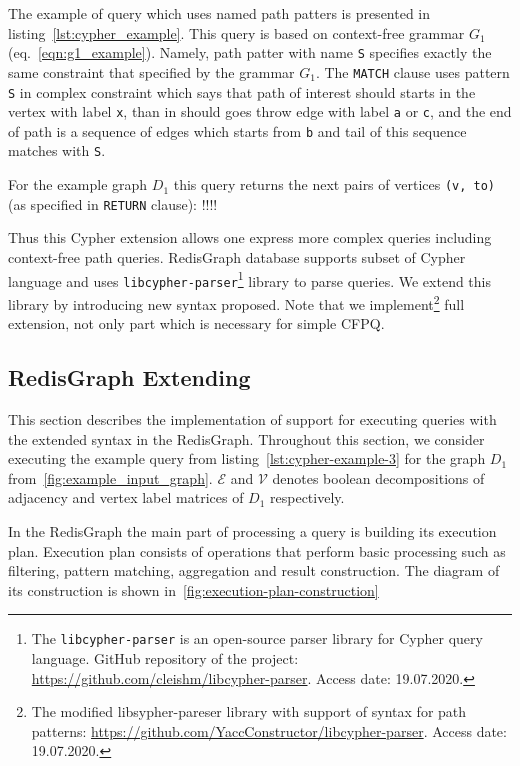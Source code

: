 The example of query which uses named path patters is presented in listing~\ref{lst:cypher_example}. 
This query is based on context-free grammar $G_1$ (eq.~\ref{eqn:g1_example}). 
Namely, path patter with name \texttt{S} specifies exactly the same constraint that specified by the grammar $G_1$. 
The \texttt{MATCH} clause uses pattern \texttt{S} in complex constraint which says that path of interest should starts in the vertex with label \texttt{x}, than in should goes throw edge with label \texttt{a} or \texttt{c}, and the end of path is a sequence of edges which starts from \texttt{b} and tail of this sequence matches with \texttt{S}.  

For the example graph $D_1$ this query returns the next pairs of vertices \texttt{(v, to)} (as specified in \texttt{RETURN} clause): !!!!

Thus this Cypher extension allows one express more complex queries including context-free path queries.
RedisGraph database supports subset of Cypher language and uses \texttt{libcypher-parser}\footnote{The \texttt{libcypher-parser} is an open-source parser library for Cypher query language. GitHub repository of the project: \url{https://github.com/cleishm/libcypher-parser}. Access date: 19.07.2020.} library to parse queries.
We extend this library by introducing new syntax proposed.
Note that we implement\footnote{The modified libsypher-pareser library with support of syntax for path patterns: \url{https://github.com/YaccConstructor/libcypher-parser}. Access date: 19.07.2020.} full extension, not only part which is necessary for simple CFPQ. 

\subsection{RedisGraph Extending}

This section describes the implementation of support for executing queries with the extended syntax in the RedisGraph. Throughout this section, we consider executing the example query from listing~\autoref{lst:cypher-example-3} for the graph $D_1$ from~\autoref{fig:example_input_graph}. $\mathcal{E}$ and $\mathcal{V}$ denotes boolean decompositions of adjacency and vertex label matrices of $D_1$ respectively. 

In the RedisGraph the main part of processing a query is building its execution plan. Execution plan consists of operations that perform basic processing such as filtering, pattern matching, aggregation and result construction. The diagram of its construction is shown in~\autoref{fig:execution-plan-construction}


